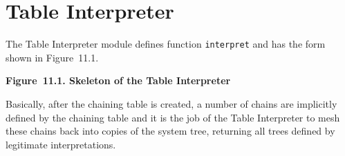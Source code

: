 \documentclass{article}
\begin{document}
\bigbreak
\begin{minipage}{\textwidth}
\end{minipage}
\bigbreak

%
%

\section{Table Interpreter}

The Table Interpreter module defines function \texttt{interpret}
and has the form shown in Figure~11.1.

\bigbreak
\begin{minipage}{\textwidth}
\vbox{}
\bigbreak
{}
\textbf{Figure~11.1. Skeleton of the Table Interpreter}
\end{minipage}
\bigbreak

Basically, after the chaining table is created, a number of
chains are implicitly defined by the chaining table and it is
the job of the Table Interpreter to mesh these chains back into
copies of the system tree, returning all trees defined by
legitimate interpretations.
\end{document}
